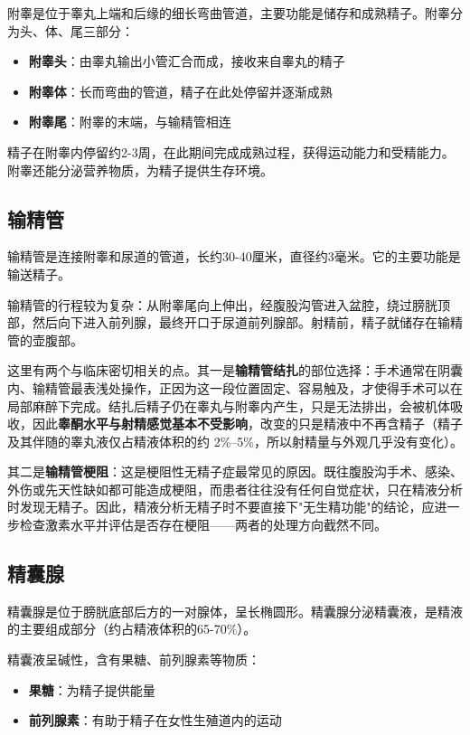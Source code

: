 附睾是位于睾丸上端和后缘的细长弯曲管道，主要功能是储存和成熟精子。附睾分为头、体、尾三部分：
\begin{itemize}
    \item \textbf{附睾头}：由睾丸输出小管汇合而成，接收来自睾丸的精子
    \item \textbf{附睾体}：长而弯曲的管道，精子在此处停留并逐渐成熟
    \item \textbf{附睾尾}：附睾的末端，与输精管相连
\end{itemize}

精子在附睾内停留约2-3周，在此期间完成成熟过程，获得运动能力和受精能力。附睾还能分泌营养物质，为精子提供生存环境。

\subsection{输精管}

输精管是连接附睾和尿道的管道，长约30-40厘米，直径约3毫米。它的主要功能是输送精子。

输精管的行程较为复杂：从附睾尾向上伸出，经腹股沟管进入盆腔，绕过膀胱顶部，然后向下进入前列腺，最终开口于尿道前列腺部。射精前，精子就储存在输精管的壶腹部。


这里有两个与临床密切相关的点。其一是\textbf{输精管结扎}的部位选择：手术通常在阴囊内、输精管最表浅处操作，正因为这一段位置固定、容易触及，才使得手术可以在局部麻醉下完成。结扎后精子仍在睾丸与附睾内产生，只是无法排出，会被机体吸收，因此\textbf{睾酮水平与射精感觉基本不受影响}，改变的只是精液中不再含精子（精子及其伴随的睾丸液仅占精液体积的约 2\%--5\%，所以射精量与外观几乎没有变化）。

其二是\textbf{输精管梗阻}：这是梗阻性无精子症最常见的原因。既往腹股沟手术、感染、外伤或先天性缺如都可能造成梗阻，而患者往往没有任何自觉症状，只在精液分析时发现无精子。因此，精液分析无精子时不要直接下"无生精功能"的结论，应进一步检查激素水平并评估是否存在梗阻——两者的处理方向截然不同。

\subsection{精囊腺}

精囊腺是位于膀胱底部后方的一对腺体，呈长椭圆形。精囊腺分泌精囊液，是精液的主要组成部分（约占精液体积的65-70\%）。

精囊液呈碱性，含有果糖、前列腺素等物质：
\begin{itemize}
    \item \textbf{果糖}：为精子提供能量
    \item \textbf{前列腺素}：有助于精子在女性生殖道内的运动
\end{itemize}

